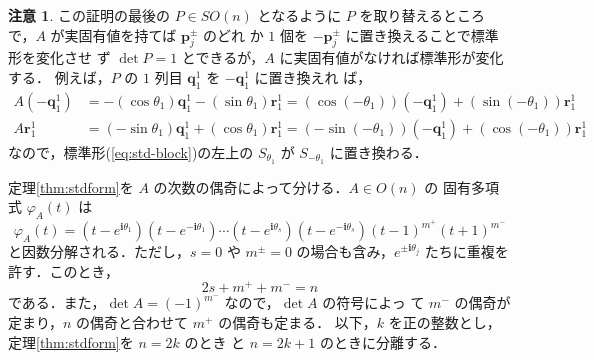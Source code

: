 \documentclass[11pt, uplatex, dvipdfmx, titlepage]{jsarticle}
\renewcommand{\i}{\mathbf{i}}
\theoremstyle{definition}
\newtheorem*{remark}{注意}
\begin{document}
\begin{remark}
  この証明の最後の $P \in SO(n)$ となるように $P$ を取り替えるところ
  で，$A$ が実固有値を持てば $\bm{p}^{\pm}_{j}$ のどれ
  か $1$ 個を $-\bm{p}^{\pm}_j$ に置き換えることで標準形を変化させ
  ず $\det P=1$ とできるが，$A$ に実固有値がなければ標準形が変化する．
  例えば，$P$ の $1$ 列目 $\bm{q}^1_1$ を $-\bm{q}^1_1$ に置き換えれ
  ば，
\[
  \begin{aligned}
    A \left( -\bm{q}^1_1\right) &= -\left( \cos
      \theta_1\right)\bm{q}^1_1 -\left( \sin \theta_1\right)
    \bm{r}^{1}_1 = \left(
      \cos\left(-\theta_1\right)\right)\left(-\bm{q}^1_1\right) +
    \left( \sin \left(-\theta_1\right) \right) \bm{r}^1_1\\
    A\bm{r}^1_1&= \left( -\sin \theta_1\right) \bm{q}^1_1 + \left(
      \cos \theta_1\right) \bm{r}^1_1 =
    \left(-\sin\left(-\theta_1\right)\right) \left( -\bm{q}^1_1\right)
    + \left( \cos\left(-\theta_1\right)\right) \bm{r}^1_1
  \end{aligned}
\]
なので，標準形(\ref{eq:std-block})の左上の $S_{\theta_1}$ が $S_{-\theta_1}$ に置き換わる．
\end{remark}

定理\ref{thm:stdform}を $A$ の次数の偶奇によって分ける．$A\in O(n)$ の
固有多項式 $\varphi_A(t)$ は
\begin{equation}\label{eq:eigen-poly}
  \varphi_A(t)=(t-e^{\i \theta_1})(t-e^{-\i \theta_1}) \cdots
  (t-e^{\i\theta_s})(t-e^{-\i \theta_s})(t-1)^{m^+}(t+1)^{m^-}
\end{equation}
と因数分解される．ただし，$s=0$ や $m^{\pm}=0$ の場合も含み，$e^{\pm
  \i\theta_j}$ たちに重複を許す．このとき，
\begin{equation}\label{eq:deg-eigen}
  2s+ m^{+} + m^{-} = n
\end{equation}
である．また，$\det A=(-1)^{m^-}$ なので，$\det A$ の符号によっ
て $m^{-}$ の偶奇が定まり，$n$ の偶奇と合わせて $m^{+}$ の偶奇も定まる．
以下，$k$ を正の整数とし，定理\ref{thm:stdform}を $n=2k$ のとき
と $n=2k+1$ のときに分離する．
\end{document}
